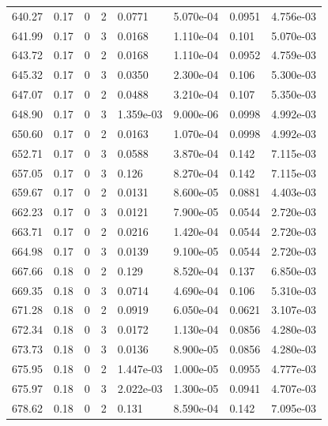 \documentclass[preview]{standalone}
\begin{document}
{{{{{{{{{{\begin{tabular}{L{1.2cm}C{1.2cm} C{0.3cm}C{0.5cm} C{1.4cm}C{1.4cm} C{1.4cm}C{1.4cm}}
  640.27  &  0.17  & 0     &  2 &  0.0771  & 5.070e-04  & 0.0951 &  4.756e-03   \\ 
  641.99  &  0.17  & 0     &  3 &  0.0168  & 1.110e-04  & 0.101 &  5.070e-03   \\ 
  643.72  &  0.17  & 0     &  2 &  0.0168  & 1.110e-04  & 0.0952 &  4.759e-03   \\ 
  645.32  &  0.17  & 0     &  3 &  0.0350  & 2.300e-04  & 0.106 &  5.300e-03   \\ 
  647.07  &  0.17  & 0     &  2 &  0.0488  & 3.210e-04  & 0.107 &  5.350e-03   \\ 
  648.90  &  0.17  & 0     &  3 &  1.359e-03  & 9.000e-06  & 0.0998 &  4.992e-03   \\ 
  650.60  &  0.17  & 0     &  2 &  0.0163  & 1.070e-04  & 0.0998 &  4.992e-03   \\ 
  652.71  &  0.17  & 0     &  3 &  0.0588  & 3.870e-04  & 0.142 &  7.115e-03   \\ 
  657.05  &  0.17  & 0     &  3 &  0.126  & 8.270e-04  & 0.142 &  7.115e-03   \\ 
  659.67  &  0.17  & 0     &  2 &  0.0131  & 8.600e-05  & 0.0881 &  4.403e-03   \\ 
  662.23  &  0.17  & 0     &  3 &  0.0121  & 7.900e-05  & 0.0544 &  2.720e-03   \\ 
  663.71  &  0.17  & 0     &  2 &  0.0216  & 1.420e-04  & 0.0544 &  2.720e-03   \\ 
  664.98  &  0.17  & 0     &  3 &  0.0139  & 9.100e-05  & 0.0544 &  2.720e-03   \\ 
  667.66  &  0.18  & 0     &  2 &  0.129  & 8.520e-04  & 0.137 &  6.850e-03   \\ 
  669.35  &  0.18  & 0     &  3 &  0.0714  & 4.690e-04  & 0.106 &  5.310e-03   \\ 
  671.28  &  0.18  & 0     &  2 &  0.0919  & 6.050e-04  & 0.0621 &  3.107e-03   \\ 
  672.34  &  0.18  & 0     &  3 &  0.0172  & 1.130e-04  & 0.0856 &  4.280e-03   \\ 
  673.73  &  0.18  & 0     &  3 &  0.0136  & 8.900e-05  & 0.0856 &  4.280e-03   \\ 
  675.95  &  0.18  & 0     &  2 &  1.447e-03  & 1.000e-05  & 0.0955 &  4.777e-03   \\ 
  675.97  &  0.18  & 0     &  3 &  2.022e-03  & 1.300e-05  & 0.0941 &  4.707e-03   \\ 
  678.62  &  0.18  & 0     &  2 &  0.131  & 8.590e-04  & 0.142 &  7.095e-03   \\ 

\end{tabular}}}}}}}}}}}
\end{document}
